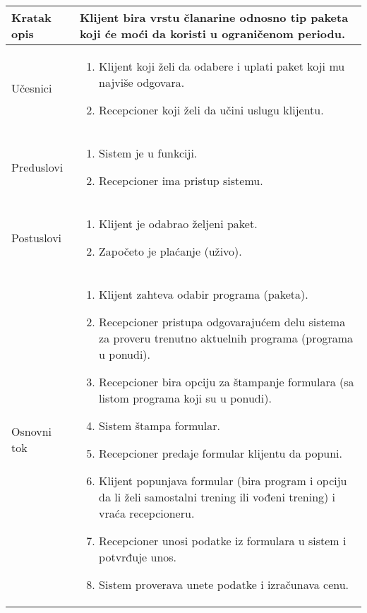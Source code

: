 \documentclass[../main.tex]{subfiles}
\begin{document}
\begin{longtable}{| p{} | p{} |} 

\hline
    Kratak opis & Klijent bira vrstu članarine odnosno tip paketa koji će moći da koristi u ograničenom periodu. \\ 
\hline    
    Učesnici & 
    	\begin{enumerate}
        \item Klijent koji želi da odabere i uplati paket koji mu najviše odgovara.
        \item Recepcioner koji želi da učini uslugu klijentu.
     \end{enumerate}\\
\hline
   Preduslovi & \begin{enumerate}
       \item Sistem je u funkciji.
       \item Recepcioner ima pristup sistemu.
   \end{enumerate}\\
\hline  
    Postuslovi & \begin{enumerate}
        \item Klijent je odabrao željeni paket.
        \item Započeto je plaćanje (uživo).
    \end{enumerate}\\
\hline
    Osnovni tok & \begin{enumerate}
        \item Klijent zahteva odabir programa (paketa).
        \item Recepcioner pristupa odgovarajućem delu sistema za proveru trenutno aktuelnih programa (programa u ponudi).
        \item Recepcioner bira opciju za štampanje formulara (sa listom programa koji su u ponudi).
        \item Sistem štampa formular.
        \item Recepcioner predaje formular klijentu da popuni.
        \item Klijent popunjava formular (bira program i opciju da li želi samostalni trening ili vođeni trening) i vraća recepcioneru.
        \item Recepcioner unosi podatke iz formulara u sistem i potvrđuje unos.
        \item Sistem proverava unete podatke i izračunava cenu.

\end{enumerate}
\end{longtable}
\end{document}
